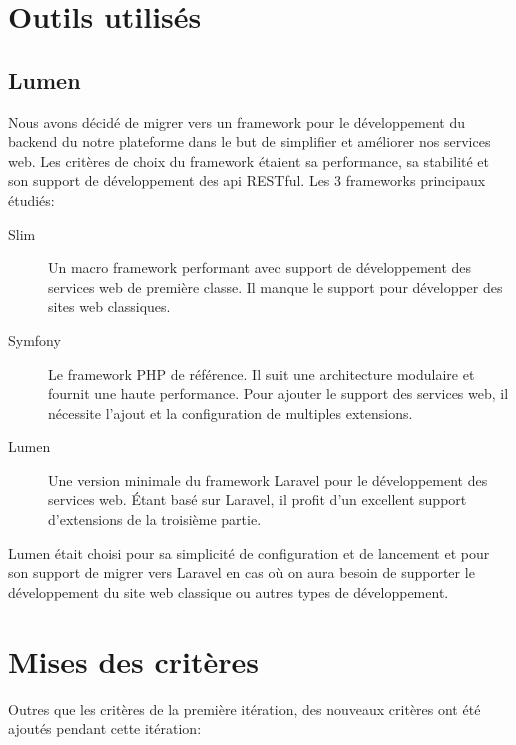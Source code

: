 
\section{Outils utilisés}

\subsection{Lumen}

Nous avons décidé de migrer vers un framework pour le développement du backend
du notre plateforme dans le but de simplifier et améliorer nos services web.
Les critères de choix du framework étaient sa performance, sa stabilité et
son support de développement des api RESTful. Les 3 frameworks principaux
étudiés:

\begin{description}
    \item [Slim] Un macro framework performant avec support de développement
        des services web de première classe. Il manque le support pour
        développer des sites web classiques.
    \item [Symfony] Le framework PHP de référence. Il suit une architecture
        modulaire et fournit une haute performance. Pour ajouter le support des
        services web, il nécessite l'ajout et la configuration de multiples
        extensions.
    \item [Lumen] Une version minimale du framework Laravel pour le
        développement des services web. Étant basé sur Laravel, il profit d'un
        excellent support d'extensions de la troisième partie.
\end{description}

Lumen était choisi pour sa simplicité de configuration et de lancement et pour son
support de migrer vers Laravel en cas où on aura besoin de supporter le
développement du site web classique ou autres types de développement.

\section{Mises des critères}

Outres que les critères de la première itération, des nouveaux critères ont
été ajoutés pendant cette itération:

